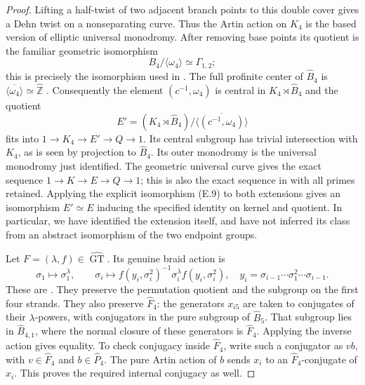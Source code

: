 \begin{proof}
Lifting a half-twist of two adjacent branch points to this double
cover gives a Dehn twist on a nonseparating curve.  Thus the Artin
action on $K_4$ is the based version of elliptic universal monodromy.
After removing base points its quotient is the familiar geometric
isomorphism
\[
 B_4/\langle\omega_4\rangle\simeq\Gamma_{1,2};
\]
this is precisely the isomorphism used in
\cite[Corollary C and the preceding paragraph]{ET_MN2022}.
The full profinite center of $\widehat B_4$ is
$\overline{\langle\omega_4\rangle}\simeq\widehat{\mathbb Z}$
\cite[\S2, equations (2.2) and (2.9)]{ET_MN2022}.
Consequently the element $(c^{-1},\omega_4)$ is central in
$K_4\rtimes\widehat B_4$ and the quotient
\[
 E'=(K_4\rtimes\widehat B_4)\big/
       \overline{\langle(c^{-1},\omega_4)\rangle}          \tag{E.12}
\]
fits into $1\to K_4\to E'\to Q\to1$.  Its central subgroup has
trivial intersection with $K_4$, as is seen by projection to
$\widehat B_4$.  Its outer monodromy is the universal monodromy just
identified.  The geometric universal curve gives the exact sequence
$1\to K\to E\to Q\to1$; this is also the exact sequence in
\cite[Theorem 6.13]{ET_HMTopicsI2012} with all primes retained.
Applying the explicit isomorphism (E.9) to both extensions gives an
isomorphism $E'\simeq E$ inducing the specified identity on kernel and
quotient.  In particular, we have identified the extension itself,
and have not inferred its class from an abstract isomorphism of
the two endpoint groups.

Let $F=(\lambda,f)\in\widehat{\operatorname{GT}}$.  Its genuine
braid action is
\[
 \sigma_1\mapsto\sigma_1^\lambda,
 \qquad
 \sigma_i\mapsto
 f(y_i,\sigma_i^2)^{-1}\sigma_i^\lambda f(y_i,\sigma_i^2),
 \quad y_i=\sigma_{i-1}\cdots\sigma_1^2\cdots\sigma_{i-1}.
                                                               \tag{E.13}
\]
These are \cite[\S0.1, equation (1)]{ET_HS2000}.  They preserve
the permutation quotient and the subgroup on the first four
strands.  They also preserve $\widehat F_4$: the generators $x_{i5}$
are taken to conjugates of their $\lambda$-powers, with conjugators
in the pure subgroup of $\widehat B_5$.  That subgroup lies in
$\widehat B_{4,1}$, where the normal closure of these generators is
$\widehat F_4$.  Applying the inverse action gives equality.
To check conjugacy inside $\widehat F_4$, write such a conjugator
as $vb$, with $v\in\widehat F_4$ and $b\in\widehat P_4$.
The pure Artin action of $b$ sends $x_i$ to an $\widehat F_4$-conjugate
of $x_i$.  This proves the required internal conjugacy as well.


\end{proof}
